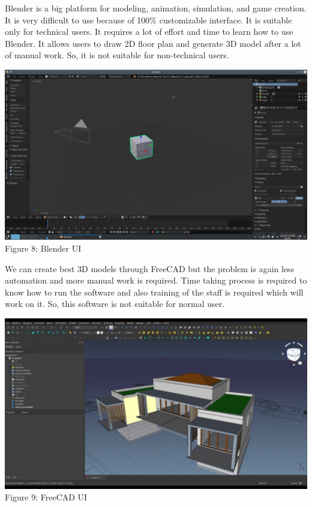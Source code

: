 \documentclass{article}
\begin{document}
Blender is a big platform for modeling, animation, simulation, and game creation. It is very difficult to use because of 100\% customizable interface. It is suitable only for technical users. It requires a lot of effort and time to learn how to use Blender. It allows users to draw 2D floor plan and generate 3D model after a lot of manual work. So, it is not suitable for non-technical users.
\begin{center}
\includegraphics[scale=0.33]{blender}
Figure 8: Blender UI
\end{center}
We can create best 3D models through FreeCAD but the problem is again less automation and more manual work is required. Time taking process is required to know how to run the software and also training of the staff is required which will work on it. So, this software is not suitable for normal user.
\\
\begin{center}
\includegraphics[scale=0.35]{freeCad}
Figure 9: FreeCAD UI
\end{center}
               
\end{document}
